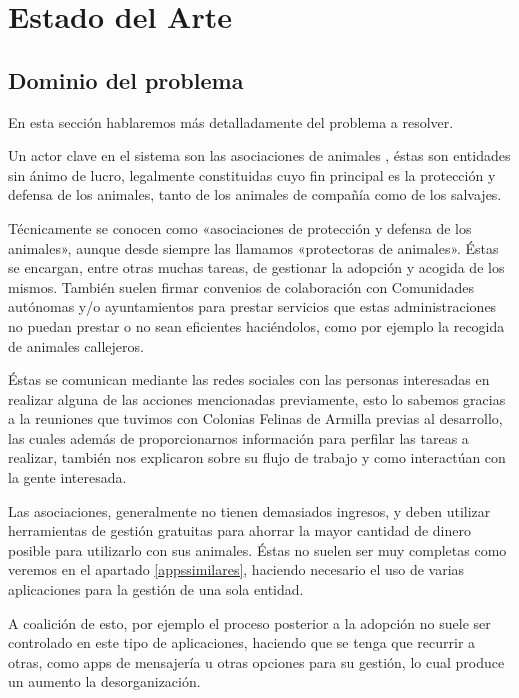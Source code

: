 \chapter{Estado del Arte}

\section{Dominio del problema} \label{dompro}

En esta sección hablaremos más detalladamente del problema a resolver. 



Un actor clave en el sistema son las asociaciones de animales \cite{asociaciones}, éstas son entidades sin ánimo de lucro, legalmente constituidas cuyo fin principal es la protección y defensa de los animales, tanto de los animales de compañía como de los salvajes.

Técnicamente se conocen como «asociaciones de protección y defensa de los animales», aunque desde siempre las llamamos «protectoras de animales». Éstas se encargan, entre otras muchas tareas, de gestionar la adopción y acogida de los mismos. También suelen firmar convenios de colaboración con Comunidades autónomas y/o ayuntamientos para prestar servicios que estas administraciones no puedan prestar o no sean eficientes haciéndolos, como por ejemplo la recogida de animales callejeros.

Éstas se comunican mediante las redes sociales con las personas interesadas en realizar alguna de las acciones mencionadas previamente, esto lo sabemos gracias a la reuniones que tuvimos con Colonias Felinas de Armilla previas al desarrollo, las cuales además de proporcionarnos información para perfilar las tareas a realizar, también nos explicaron sobre su flujo de trabajo y como interactúan con la gente interesada. 

 Las asociaciones, generalmente no tienen demasiados ingresos, y deben utilizar herramientas de gestión gratuitas para ahorrar la mayor cantidad de dinero posible para utilizarlo con sus animales. Éstas no suelen ser muy completas como veremos en el apartado \ref{appssimilares}, haciendo necesario el uso de varias aplicaciones para la gestión de una sola entidad.

A coalición de esto, por ejemplo el proceso posterior a la adopción no suele ser controlado en este tipo de aplicaciones, haciendo que se tenga que recurrir a otras, como apps de mensajería u otras opciones para su gestión, lo cual produce un aumento la desorganización.

